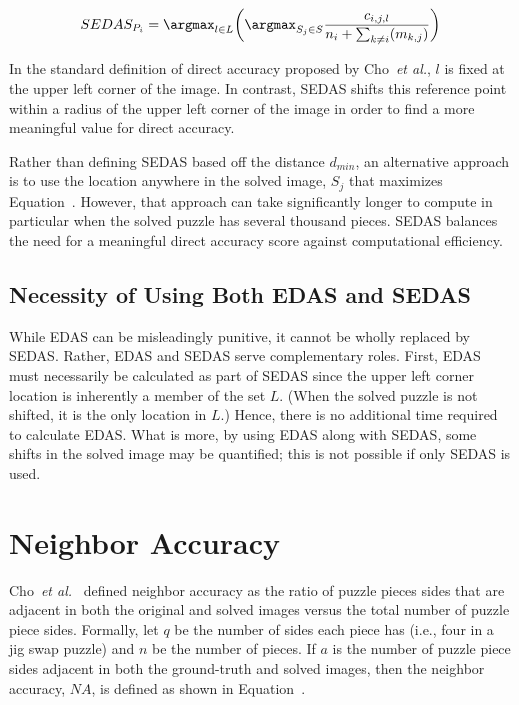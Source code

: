 \begin{equation} \label{eq:shiftableEnhancedDirectAccuracyScore}
  SEDAS_{P_i} = \argmax_{l \in L} \bigg( \argmax_{S_j \in S}\frac{c_{i,j,l}}{n_i + \sum_{k \ne i}(m_{k,j})} \bigg)
\end{equation}

In the standard definition of direct accuracy proposed by Cho~\textit{et al.}, $l$ is fixed at the upper left corner of the image.  In contrast, SEDAS shifts this reference point within a radius of the upper left corner of the image in order to find a more meaningful value for direct accuracy. 

Rather than defining SEDAS based off the distance $d_{min}$, an alternative approach is to use the location anywhere in the solved image, $S_j$ that maximizes Equation~.  However, that approach can take significantly longer to compute in particular when the solved puzzle has several thousand pieces.  SEDAS balances the need for a meaningful direct accuracy score against computational efficiency.

\subsection{Necessity of Using Both EDAS and SEDAS}\label{sec:importanceEdasSedas}

While EDAS can be misleadingly punitive, it cannot be wholly replaced by SEDAS.  Rather, EDAS and SEDAS serve complementary roles.  First, EDAS must necessarily be calculated as part of SEDAS since the upper left corner location is inherently a member of the set $L$. (When the solved puzzle is not shifted, it is the only location in $L$.)  Hence, there is no additional time required to calculate EDAS.  What is more, by using EDAS along with SEDAS, some shifts in the solved image may be quantified; this is not possible if only SEDAS is used.

\section{Neighbor Accuracy}\label{sec:neighborAccuracy}

Cho~\textit{et al.}~\cite{cho2010} defined neighbor accuracy as the ratio of puzzle pieces sides that are adjacent in both the original and solved images versus the total number of puzzle piece sides.  Formally, let $q$ be the number of sides each piece has (i.e., four in a jig swap puzzle) and $n$ be the number of pieces.  If $a$ is the number of puzzle piece sides adjacent in both the ground-truth and solved images, then the neighbor accuracy, $NA$, is defined as shown in Equation~.

